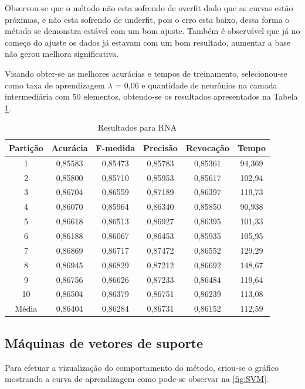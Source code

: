 Observou-se que o método não esta sofrendo de overfit dado que as curvas estão próximas, e não esta sofrendo de underfit, pois o erro esta baixo, dessa forma o método se demonstra estável com um bom ajuste. Também é observável que já no começo do ajuste os dados já estavam com um bom resultado, aumentar a base não gerou melhora significativa.

Visando obter-se as melhores acurácias e tempos de treinamento, selecionou-se como taxa de aprendizagem \(\lambda\) = 0,06 e quantidade de neurônios na camada intermediária com 50 elementos, obtendo-se os resultados apresentados na Tabela \ref{table:resultadosRNA}.
	
	
\begin{table}[h]
\centering
\caption{Resultados para RNA}
\vspace{0.2cm}
\begin{tabular}{c|c|c|c|c|c}
Partição & Acurácia & F-medida & Precisão & Revocação & Tempo \\
\hline
1  & 0,85583 & 0,85473 & 0,85783 & 0,85361 & 94,369 \\
2  & 0,85800 & 0,85710 & 0,85953 & 0,85617 & 102,94 \\
3  & 0,86704 & 0,86559 & 0,87189 & 0,86397 & 119,73 \\
4  & 0,86070 & 0,85964 & 0,86340 & 0,85850 & 90,938 \\
5  & 0,86618 & 0,86513 & 0,86927 & 0,86395 & 101,33 \\
6  & 0,86188 & 0,86067 & 0,86453 & 0,85935 & 105,95 \\
7  & 0,86869 & 0,86717 & 0,87472 & 0,86552 & 129,29 \\
8  & 0,86945 & 0,86829 & 0,87212 & 0,86692 & 148,67 \\
9  & 0,86756 & 0,86626 & 0,87233 & 0,86484 & 119,64 \\
10 & 0,86504 & 0,86379 & 0,86751 & 0,86239 & 113,08 \\
\hline
Média & 0,86404 & 0,86284 & 0,86731 & 0,86152 & 112,59 \\
\end{tabular} 
\label{table:resultadosRNA}
\end{table}

\subsection{Máquinas de vetores de suporte}
	
Para efetuar a vizualização do comportamento do método, criou-se o gráfico mostrando a curva de aprendizagem como pode-se observar na \ref{fig:SVM}.

